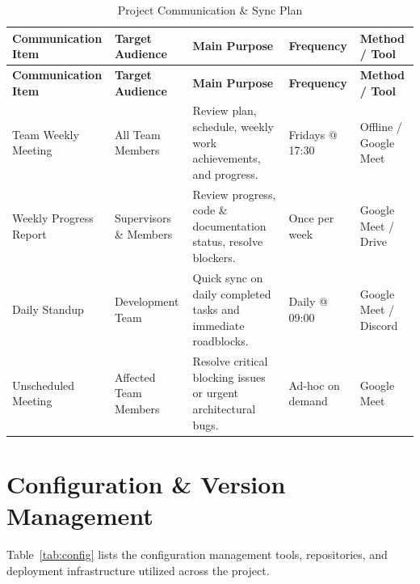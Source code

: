 \begin{footnotesize}
\begin{longtable}{|p{2.4cm}|p{2cm}|p{3.2cm}|p{2cm}|p{2.4cm}|}
\caption{Project Communication \& Sync Plan}\label{tab:comm}\\
\hline
\hline
\textbf{Communication Item} & \textbf{Target Audience} & \textbf{Main Purpose} & \textbf{Frequency} & \textbf{Method / Tool} \\
\hline
\hline
\endfirsthead
\hline
\textbf{Communication Item} & \textbf{Target Audience} & \textbf{Main Purpose} & \textbf{Frequency} & \textbf{Method / Tool} \\
\hline
\hline
\endhead
Team Weekly Meeting & All Team Members & Review plan, schedule, weekly work achievements, and progress. & Fridays @ 17:30 & Offline / Google Meet \\
\hline
Weekly Progress Report & Supervisors \& Members & Review progress, code \& documentation status, resolve blockers. & Once per week & Google Meet / Drive \\
\hline
Daily Standup & Development Team & Quick sync on daily completed tasks and immediate roadblocks. & Daily @ 09:00 & Google Meet / Discord \\
\hline
Unscheduled Meeting & Affected Team Members & Resolve critical blocking issues or urgent architectural bugs. & Ad-hoc on demand & Google Meet \\
\hline
\hline
\end{longtable}
\end{footnotesize}

\section{Configuration \& Version Management}

Table~\ref{tab:config} lists the configuration management tools, repositories, and
deployment infrastructure utilized across the project.

